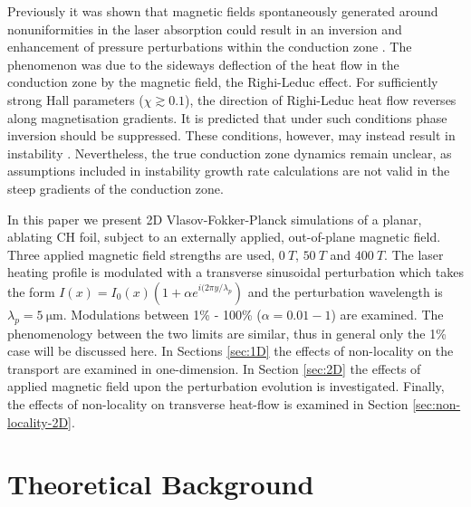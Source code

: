 \documentclass[aip,reprint]{revtex4-1}
\begin{document}
Previously it was shown that magnetic fields spontaneously generated around nonuniformities in the laser absorption could result in an inversion and enhancement of pressure perturbations  within the conduction zone \cite{Hill2018}. The phenomenon was due to the sideways deflection of the heat flow in the conduction zone by the magnetic field, the Righi-Leduc effect. For sufficiently strong Hall parameters ($\chi \gtrsim 0.1$), the direction of Righi-Leduc heat flow reverses along magnetisation gradients. It is predicted that under such conditions phase inversion should be suppressed. These conditions, however, may instead result in instability \cite{Fruchtman1992,Bissell2010a}. Nevertheless, the true conduction zone dynamics remain unclear, as assumptions included in instability growth rate calculations are not valid in the steep gradients of the conduction zone.


In this paper we present 2D Vlasov-Fokker-Planck simulations of a planar, ablating CH foil, subject to an externally applied, out-of-plane magnetic field.  Three applied magnetic field strengths are used, $\SI{0}{T}$, $\SI{50}{T}$ and $\SI{400}{T}$. The laser heating profile is modulated with a transverse sinusoidal perturbation which takes the form $I(x) = I_0(x)(1 + \alpha e^{i(2\pi y/\lambda_p})$ and the perturbation wavelength is $\lambda_p = \SI{5}{\micro\meter}$. Modulations between 1\% - 100\% ($\alpha = 0.01-1$) are examined. The phenomenology between the two limits are similar, thus in general only the 1\% case will be discussed here.  In Sections \ref{sec:1D} the effects of non-locality on the transport are examined in one-dimension. In Section \ref{sec:2D} the effects of applied magnetic field upon the perturbation evolution is investigated. Finally, the effects of non-locality on transverse heat-flow is examined in Section \ref{sec:non-locality-2D}.

\section{Theoretical Background}

\end{document}
